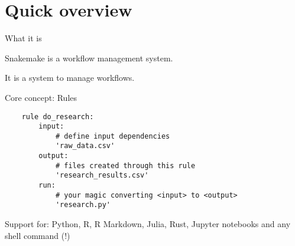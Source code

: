 \documentclass[10pt,aspectratio=169,dvipsnames]{beamer}
\begin{document}
\section{Quick overview}
\begin{frame}{What it is}
    \centering
    
    Snakemake is a workflow management system.
    

    It is a system to manage workflows.
    
\end{frame}

\begin{frame}[fragile]{Core concept: Rules}
    
\begin{lstlisting}
    rule do_research:
        input:
            # define input dependencies
            'raw_data.csv' 
        output:
            # files created through this rule
            'research_results.csv' 
        run:
            # your magic converting <input> to <output>
            'research.py'
\end{lstlisting}

Support for: Python, R, R Markdown, Julia, Rust, Jupyter notebooks and any shell command (!)
    
\end{frame}
\end{document}
